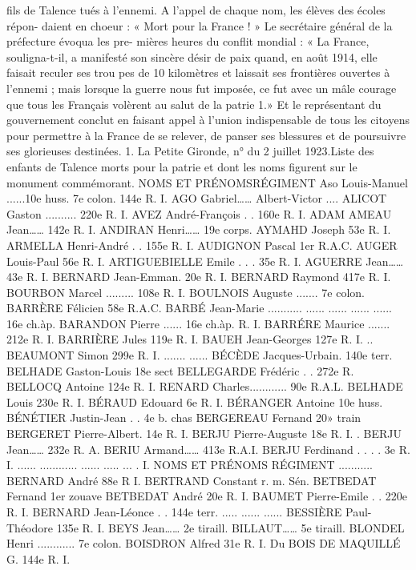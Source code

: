 \documentclass[a4paper,11pt]{book}
\begin{document}
fils de Talence tués à l'ennemi.
A l'appel de chaque nom, les élèves des écoles répon-
daient en choeur : « Mort pour la France ! »
Le secrétaire général de la préfecture évoqua les pre-
mières heures du conflit mondial :
« La France, souligna-t-il, a manifesté son sincère désir
de paix quand, en août 1914, elle faisait reculer ses trou
pes de 10 kilomètres et laissait ses frontières ouvertes à
l'ennemi ; mais lorsque la guerre nous fut imposée, ce fut
avec un mâle courage que tous les Français volèrent au
salut de la patrie 1.»
Et le représentant du gouvernement conclut en faisant
appel à l'union indispensable de tous les citoyens pour
permettre à la France de se relever, de panser ses blessures
et de poursuivre ses glorieuses destinées.
1. La Petite Gironde, n° du 2 juillet 1923.Liste des enfants de Talence morts pour la patrie
et dont les noms figurent sur le monument commémorant.
NOMS ET PRÉNOMSRÉGIMENT
Aso Louis-Manuel ......10e huss.
7e colon.
144e R. I.
AGO Gabriel……
Albert-Victor ....
ALICOT Gaston .......... 220e R. I.
AVEZ André-François . . 160e R. I.
ADAM
AMEAU Jean……
142e R. I.
ANDIRAN Henri……
19e corps.
AYMAHD Joseph
53e R. I.
ARMELLA Henri-André . . 155e R. I.
AUDIGNON Pascal
1er R.A.C.
AUGER Louis-Paul
56e R. I.
ARTIGUEBIELLE Emile . . . 35e R. I.
AGUERRE Jean……
43e R. I.
BERNARD
Jean-Emman. 20e R. I.
BERNARD Raymond
417e R. I.
BOURBON Marcel ......... 108e R. I.
BOULNOIS Auguste ....... 7e colon.
BARRÈRE Félicien
58e R.A.C.
BARBÉ Jean-Marie
...........
......
......
......
...... 16e ch.àp.
BARANDON
Pierre ......
16e
ch.àp.
R. I.
BARRÉRE Maurice ....... 212e R. I.
BARRIÈRE Jules
119e R. I.
BAUEH Jean-Georges
127e R. I.
..
BEAUMONT Simon
299e R. I.
.......
......
BÉCÈDE Jacques-Urbain. 140e
terr.
BELHADE Gaston-Louis
18e sect
BELLEGARDE Frédéric . . 272e R.
BELLOCQ Antoine
124e R. I.
RENARD Charles............ 90e R.A.L.
BELHADE Louis
230e R. I.
BÉRAUD Edouard
6e R. I.
BÉRANGER Antoine
10e huss.
BÉNÉTIER Justin-Jean . . 4e b. chas
BERGEREAU Fernand
20» train
BERGERET Pierre-Albert. 14e R. I.
BERJU Pierre-Auguste
18e R. I.
.
BERJU Jean……
232e R. A.
BERIU Armand……
413e R.A.I.
BERJU Ferdinand . . . . 3e R. I.
......
............
......
.....
...
.
I.
NOMS ET PRÉNOMS
RÉGIMENT
...........
BERNARD André
88e R I.
BERTRAND Constant
r. m. Sén.
BETBEDAT Fernand
1er zouave
BETBEDAT André
20e R. I.
BAUMET Pierre-Emile . . 220e R. I.
BERNARD Jean-Léonce . . 144e terr.
.....
......
......
BESSIÈRE Paul-Théodore 135e R. I.
BEYS Jean……
2e tiraill.
BILLAUT……
5e tiraill.
BLONDEL Henri ............ 7e colon.
BOISDRON Alfred
31e R. I.
Du BOIS DE MAQUILLÉ G. 144e R. I.
\end{document}
